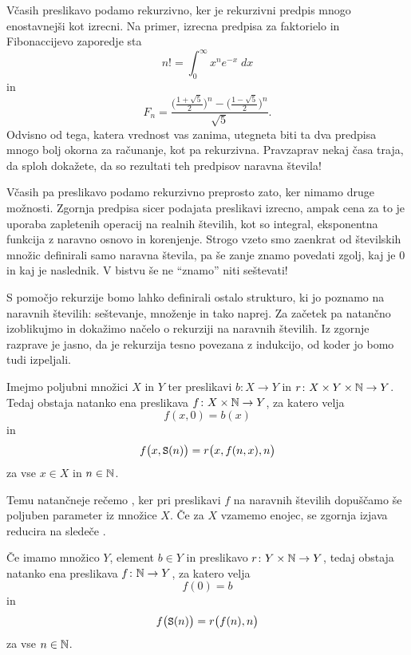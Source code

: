 Včasih preslikavo podamo rekurzivno, ker je rekurzivni predpis mnogo enostavnejši kot izrecni. Na primer, izrecna predpisa za faktorielo in Fibonaccijevo zaporedje sta
\[n! = \int_0^\infty x^n e^{-x} \; dx\]
in
\[F_n = \frac{\Big(\frac{1+\sqrt{5}}{2}\Big)^n - \Big(\frac{1-\sqrt{5}}{2}\Big)^n}{\sqrt{5}}.\]
Odvisno od tega, katera vrednost vas zanima, utegneta biti ta dva predpisa mnogo bolj okorna za računanje, kot pa rekurzivna. Pravzaprav nekaj časa traja, da sploh dokažete, da so rezultati teh predpisov naravna števila!

Včasih pa preslikavo podamo rekurzivno preprosto zato, ker nimamo druge možnosti. Zgornja predpisa sicer podajata preslikavi izrecno, ampak cena za to je uporaba zapletenih operacij na realnih številih, kot so integral, eksponentna funkcija z naravno osnovo in korenjenje. Strogo vzeto smo zaenkrat od številskih množic definirali samo naravna števila, pa še zanje znamo povedati zgolj, kaj je $0$ in kaj je naslednik. V bistvu še ne ``znamo'' niti seštevati!

S pomočjo rekurzije bomo lahko definirali ostalo strukturo, ki jo poznamo na naravnih številih: seštevanje, množenje in tako naprej. Za začetek pa natančno izoblikujmo in dokažimo načelo o rekurziji na naravnih številih. Iz zgornje razprave je jasno, da je rekurzija tesno povezana z indukcijo, od koder jo bomo tudi izpeljali.

\begin{izrek}\label{izrek:rekurzija}
Imejmo poljubni množici $X$ in $Y$ ter preslikavi $b\colon X \to Y$ in $r\colon X \times Y \times \mathbb{N} \to Y$. Tedaj obstaja natanko ena preslikava $f\colon X \times \mathbb{N} \to Y$, za katero velja
\[f(x, 0) = b(x)\]
in
\[f\big(x, \mathtt{S}(n)\big) = r\big(x, f(n, x), n\big)\]
za vse $x \in X$ in $n \in \mathbb{N}$.

Temu natančneje rečemo , ker pri preslikavi $f$ na naravnih številih dopuščamo še poljuben parameter iz množice $X$. Če za $X$ vzamemo enojec, se zgornja izjava reducira na sledeče .

Če imamo množico $Y$, element $b \in Y$ in preslikavo $r\colon Y \times \mathbb{N} \to Y$, tedaj obstaja natanko ena preslikava $f\colon \mathbb{N} \to Y$, za katero velja
\[f(0) = b\]
in
\[f\big(\mathtt{S}(n)\big) = r\big(f(n), n\big)\]
za vse $n \in \mathbb{N}$.
\end{izrek}

\begin{dokaz}
\end{dokaz}

